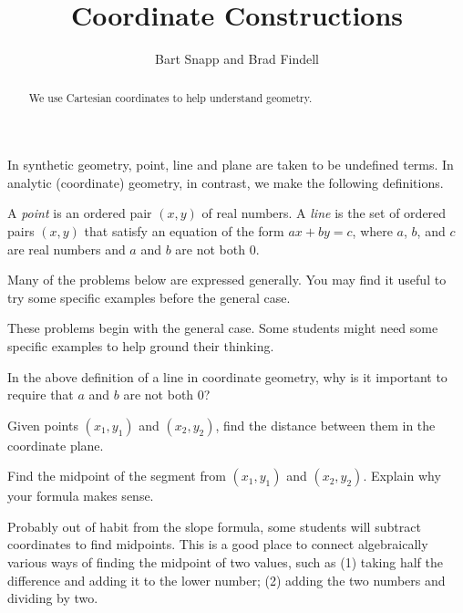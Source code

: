 \documentclass[nooutcomes]{ximera}
\title{Coordinate Constructions}
\author{Bart Snapp and Brad Findell}
\begin{document}
\begin{abstract}
  We use Cartesian coordinates to help understand geometry.
\end{abstract}
\maketitle

In synthetic geometry, point, line and plane are taken to be undefined terms.  In analytic (coordinate) geometry, in contrast, we make the following definitions.  
\begin{definition}
A \emph{point} is an ordered pair $(x,y)$ of real numbers. A \emph{line} is the set of ordered pairs $(x,y)$ that satisfy an equation of the form $ax + by = c$, where $a$, $b$, and $c$ are real numbers and $a$ and $b$ are not both 0.   
\end{definition}

Many of the problems below are expressed generally.  You may find it useful to try some specific examples before the general case.  

\begin{teachingnote}
These problems begin with the general case.  Some students might need some specific examples to help ground their thinking.
\end{teachingnote}

\begin{problem}
In the above definition of a line in coordinate geometry, why is it important to require that $a$ and $b$ are not both 0?  
\vfill
\end{problem}

\begin{problem}
Given points $(x_1, y_1)$ and $(x_2, y_2)$, find the distance between them in the coordinate plane.
\vfill
\end{problem}

\begin{problem}
Find the midpoint of the segment from $(x_1, y_1)$ and $(x_2, y_2)$.  Explain why your formula makes sense. 
\vfill
\end{problem}

\begin{teachingnote}
Probably out of habit from the slope formula, some students will subtract coordinates to find midpoints.  This is a good place to connect algebraically various ways of finding the midpoint of two values, such as (1) taking half the difference and adding it to the lower number; (2) adding the two numbers and dividing by two. 
\end{teachingnote}   
\end{document}
